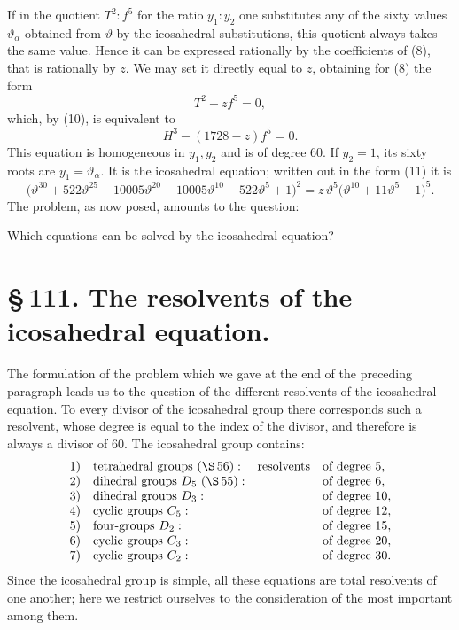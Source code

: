 \documentclass[11pt]{article}
\begin{document}
If in the quotient \(T^2:f^5\) for the ratio \(y_1:y_2\) one substitutes any of the sixty values \(\vartheta_\alpha\) obtained from \(\vartheta\) by the icosahedral substitutions, this quotient always takes the same value. Hence it can be expressed rationally by the coefficients of (8), that is rationally by \(z\). We may set it directly equal to \(z\), obtaining for (8) the form
\begin{equation}
T^2-zf^5=0,
\tag{11}
\end{equation}
which, by (10), is equivalent to
\[
H^3-(1728-z)f^5=0.
\]
This equation is homogeneous in \(y_1,y_2\) and is of degree \(60\). If \(y_2=1\), its sixty roots are \(y_1=\vartheta_\alpha\). It is the icosahedral equation; written out in the form (11) it is
\[
\bigl(\vartheta^{30}+522\vartheta^{25}-10005\vartheta^{20}
-10005\vartheta^{10}-522\vartheta^5+1\bigr)^2
=
z\,\vartheta^5\bigl(\vartheta^{10}+11\vartheta^5-1\bigr)^5.
\]
The problem, as now posed, amounts to the question:

\begin{center}
Which equations can be solved by the icosahedral equation?
\end{center}


\section*{\S\,111. The resolvents of the icosahedral equation.}

The formulation of the problem which we gave at the end of the preceding paragraph leads us to the question of the different resolvents of the icosahedral equation. To every divisor of the icosahedral group there corresponds such a resolvent, whose degree is equal to the index of the divisor, and therefore is always a divisor of 60. The icosahedral group contains:
\[
\begin{array}{rlcl}
1)&\text{tetrahedral groups }(\S\,56):&\text{resolvents}&\text{of degree }5,\\
2)&\text{dihedral groups }D_5\ (\S\,55):&&\text{of degree }6,\\
3)&\text{dihedral groups }D_3:&&\text{of degree }10,\\
4)&\text{cyclic groups }C_5:&&\text{of degree }12,\\
5)&\text{four-groups }D_2:&&\text{of degree }15,\\
6)&\text{cyclic groups }C_3:&&\text{of degree }20,\\
7)&\text{cyclic groups }C_2:&&\text{of degree }30.
\end{array}
\]
Since the icosahedral group is simple, all these equations are total resolvents of one another; here we restrict ourselves to the consideration of the most important among them.
\end{document}
